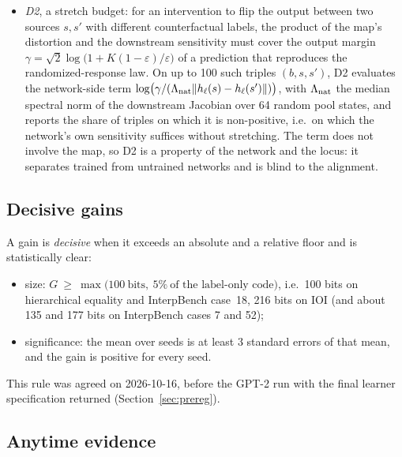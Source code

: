 \documentclass[11pt,a4paper]{article}
\begin{document}
\begin{itemize}
\item \emph{D2}, a stretch budget: for an intervention to flip the output between two sources $s,s'$ with different counterfactual labels, the product of the map's distortion and the downstream sensitivity must cover the output margin $\gamma=\sqrt2\log\bigl(1+K(1-\varepsilon)/\varepsilon\bigr)$ of a prediction that reproduces the randomized-response law. On up to 100 such triples $(b,s,s')$, D2 evaluates the network-side term $\log\bigl(\gamma/(\Lambda_{\rm nat}\|h_\ell(s)-h_\ell(s')\|)\bigr)$, with $\Lambda_{\rm nat}$ the median spectral norm of the downstream Jacobian over 64 random pool states, and reports the share of triples on which it is non-positive, i.e.\ on which the network's own sensitivity suffices without stretching. The term does not involve the map, so D2 is a property of the network and the locus: it separates trained from untrained networks and is blind to the alignment.
\end{itemize}

\subsection{Decisive gains}
\label{sec:decisive}

A gain is \emph{decisive} when it exceeds an absolute and a relative floor and is statistically clear:
\begin{itemize}
\item size: $G\ \ge\ \max\bigl(100\ \text{bits},\ 5\%\ \text{of the label-only code}\bigr)$, i.e.\ 100 bits on hierarchical equality and InterpBench case~18, 216 bits on IOI (and about 135 and 177 bits on InterpBench cases 7 and 52);
\item significance: the mean over seeds is at least $3$ standard errors of that mean, and the gain is positive for every seed.
\end{itemize}
This rule was agreed on 2026-10-16, before the GPT-2 run with the final learner specification returned (Section~\ref{sec:prereg}).

\subsection{Anytime evidence}
\label{sec:anytime}
\end{document}
